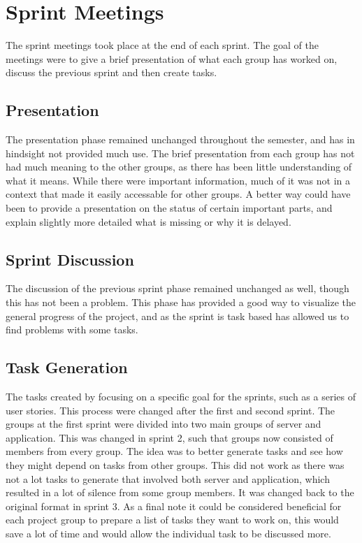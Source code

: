 \section{Sprint Meetings}
The sprint meetings took place at the end of each sprint. The goal of the
meetings were to give a brief presentation of what each group has worked on,
discuss the previous sprint and then create tasks.\nl

\subsection{Presentation}
The presentation phase remained unchanged throughout the semester, and has in
hindsight not provided much use. The brief presentation from each group has not
had much meaning to the other groups, as there has been little understanding of
what it means. While there were important information, much of it was not in a
context that made it easily accessable for other groups. A better way could have
been to provide a presentation on the status of certain important parts, and
explain slightly more detailed what is missing or why it is delayed.\nl

\subsection{Sprint Discussion}
The discussion of the previous sprint phase remained unchanged as well,
though this has not been a problem. This phase has provided a good way to
visualize the general progress of the project, and as the sprint is task based
has allowed us to find problems with some tasks.\nl

\subsection{Task Generation}
The tasks created by focusing on a specific goal for the sprints, such as a
series of user stories. This process were changed after the first and second
sprint. The groups at the first sprint were divided into two main groups of
server and application. This was changed in sprint 2, such that groups now
consisted of members from every group. The idea was to better generate tasks and
see how they might depend on tasks from other groups. This did not work as there
was not a lot tasks to generate that involved both server and application, which
resulted in a lot of silence from some group members. It was changed back to the
original format in sprint 3. As a final note it could be considered beneficial
for each project group to prepare a list of tasks they want to work on, this
would save a lot of time and would allow the individual task to be discussed
more.

